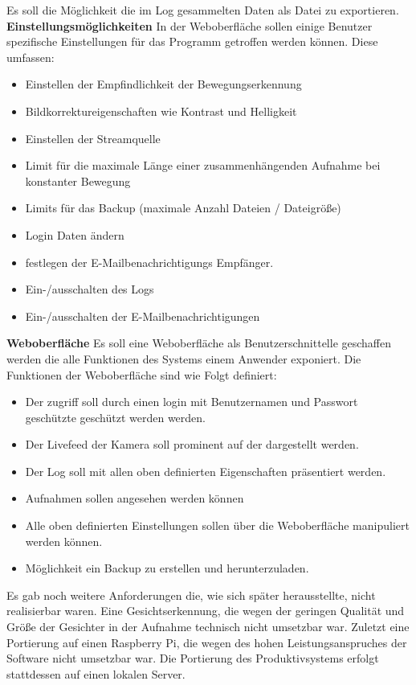 Es soll die Möglichkeit die im Log gesammelten Daten als Datei zu exportieren.
\newline
\textbf{Einstellungsmöglichkeiten}\newline
In der Weboberfläche sollen einige Benutzer spezifische Einstellungen für das Programm getroffen werden können.
Diese umfassen: 
\begin{itemize}
\item Einstellen der Empfindlichkeit der Bewegungserkennung
\item Bildkorrektureigenschaften wie Kontrast und Helligkeit
\item Einstellen der Streamquelle
\item Limit für die maximale Länge einer zusammenhängenden Aufnahme bei konstanter Bewegung
\item Limits für das Backup (maximale Anzahl Dateien / Dateigröße)
\item Login Daten ändern
\item festlegen der E-Mailbenachrichtigungs Empfänger.
\item Ein-/ausschalten des Logs
\item Ein-/ausschalten der E-Mailbenachrichtigungen
\end{itemize}
\textbf{Weboberfläche}\newline
Es soll eine Weboberfläche als Benutzerschnittelle geschaffen werden die alle Funktionen des Systems einem Anwender exponiert.
Die Funktionen der Weboberfläche sind wie Folgt definiert:
\begin{itemize}
\item Der zugriff soll durch einen login mit Benutzernamen und Passwort geschützte geschützt werden werden.
\item Der Livefeed der Kamera soll prominent auf der dargestellt werden.
\item Der Log soll mit allen oben definierten Eigenschaften präsentiert werden.
\item Aufnahmen sollen angesehen werden können
\item Alle oben definierten Einstellungen sollen über die Weboberfläche manipuliert werden können.
\item Möglichkeit ein Backup zu erstellen und herunterzuladen.
\end{itemize}
Es gab noch weitere Anforderungen die, wie sich später herausstellte, nicht realisierbar waren. Eine Gesichtserkennung, die wegen der geringen Qualität und Größe der Gesichter in der Aufnahme technisch nicht umsetzbar war.  Zuletzt eine Portierung auf einen Raspberry Pi, die wegen des hohen Leistungsanspruches der Software nicht umsetzbar war. Die Portierung des Produktivsystems erfolgt stattdessen auf einen lokalen Server.
 

